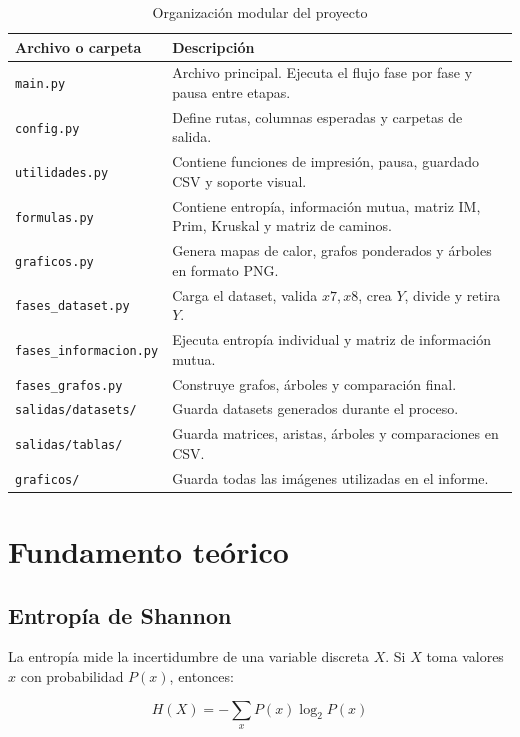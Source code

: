 \documentclass[12pt,a4paper]{article}
\newcommand{\formula}[1]{
\begin{cajaformula}
\centering
#1
\end{cajaformula}
}
\begin{document}
\begin{table}[H]
\centering
\caption{Organización modular del proyecto}
\label{tab:organizacion}
\begin{tabular}{p{5cm}p{9cm}}
\toprule
\textbf{Archivo o carpeta} & \textbf{Descripción} \\
\midrule
\texttt{main.py} & Archivo principal. Ejecuta el flujo fase por fase y pausa entre etapas. \\
\texttt{config.py} & Define rutas, columnas esperadas y carpetas de salida. \\
\texttt{utilidades.py} & Contiene funciones de impresión, pausa, guardado CSV y soporte visual. \\
\texttt{formulas.py} & Contiene entropía, información mutua, matriz IM, Prim, Kruskal y matriz de caminos. \\
\texttt{graficos.py} & Genera mapas de calor, grafos ponderados y árboles en formato PNG. \\
\texttt{fases\_dataset.py} & Carga el dataset, valida \(x7,x8\), crea \(Y\), divide y retira \(Y\). \\
\texttt{fases\_informacion.py} & Ejecuta entropía individual y matriz de información mutua. \\
\texttt{fases\_grafos.py} & Construye grafos, árboles y comparación final. \\
\texttt{salidas/datasets/} & Guarda datasets generados durante el proceso. \\
\texttt{salidas/tablas/} & Guarda matrices, aristas, árboles y comparaciones en CSV. \\
\texttt{graficos/} & Guarda todas las imágenes utilizadas en el informe. \\
\bottomrule
\end{tabular}
\end{table}

\section{Fundamento teórico}

\subsection{Entropía de Shannon}

La entropía mide la incertidumbre de una variable discreta \(X\). Si \(X\) toma valores \(x\) con probabilidad \(P(x)\), entonces:

\formula{
\[
H(X)=-\sum_x P(x)\log_2 P(x)
\]
}
\end{document}
